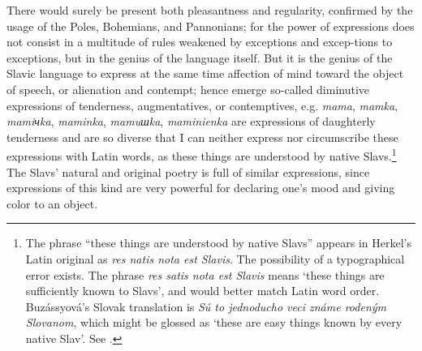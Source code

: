 There would surely be present both pleasantness and regularity, confirmed by the usage of the Poles, Bohemians, and Pannonians; for the power of expressions does not consist in a multitude of rules weakened by exceptions and excep-\linebreak{}tions to exceptions, but in the genius of the language itself. But it is the genius of the Slavic language to express at the same time affection of mind toward the object of speech, or alienation and contempt; hence emerge so-called diminutive expressions of tenderness, augmentatives, or contemptives, e.g. \textit{mama}, \textit{mamka}, \textit{mamiчka}, \textit{maminka}, \textit{mamuшka}, \textit{maminienka} are expressions of daughterly tenderness and are so diverse that I can neither express nor circumscribe these \linebreak{}expressions with Latin words, as these things are understood by native Slavs.{\enlargethispage{\baselineskip}\footnote{The phrase “these things are understood by native Slavs” appears in Herkel’s Latin original as \textit{res natis nota est Slavis}. The possibility of a typographical error exists. The phrase \textit{res satis nota est Slavis} means ‘these things are sufficiently known to Slavs’, and would better match Latin word order. Buzássyová’s Slovak translation is \textit{Sú to jednoducho veci známe rodeným Slovanom}, which might be glossed as ‘these are easy things known by every native Slav’. See \citet[95]{herkel_jan_2009}.}} The Slavs’ natural and original poetry is full of similar expressions, since expressions of this kind are very powerful for declaring one’s mood and giving color to an object.


